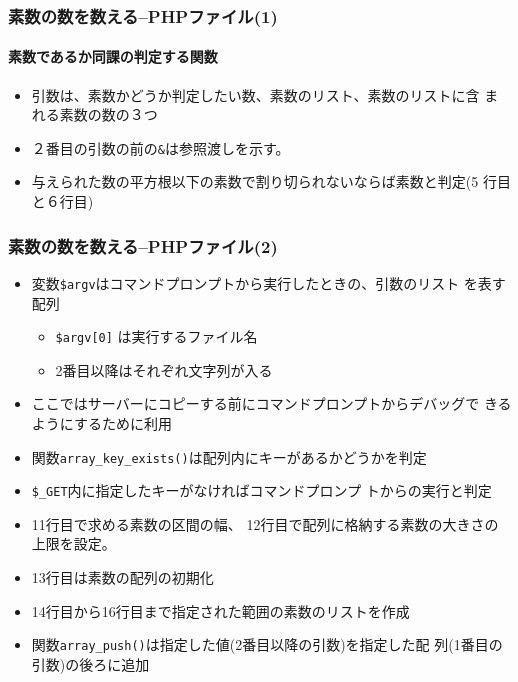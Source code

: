 \begin{frame}[containsverbatim]
 \frametitle{素数の数を数える--PHPファイル(1)}
 \framesubtitle{素数であるか同課の判定する関数}
 \begin{itemize}
  \item 引数は、素数かどうか判定したい数、素数のリスト、素数のリストに含
        まれる素数の数の３つ
  \item ２番目の引数の前の\texttt{\&}は参照渡しを示す。
  \item 与えられた数の平方根以下の素数で割り切られないならば素数と判定(5
        行目と６行目)
 \end{itemize}
\end{frame}
\begin{frame}[containsverbatim]
 \frametitle{素数の数を数える--PHPファイル(2)}
 \scriptsize
 \begin{itemize}
  \item 変数\Verb+$argv+はコマンドプロンプトから実行したときの、引数のリスト
        を表す配列
        \begin{itemize} \scriptsize

         \item \Verb+$argv[0]+ は実行するファイル名
         \item 2番目以降はそれぞれ文字列が入る
        \end{itemize}
  \item ここではサーバーにコピーする前にコマンドプロンプトからデバッグで
        きるようにするために利用
  \item 関数\Verb+array_key_exists()+は配列内にキーがあるかどうかを判定
  \item \Verb+$_GET+内に指定したキーがなければコマンドプロンプ
        トからの実行と判定
  \item 11行目で求める素数の区間の幅、
        12行目で配列に格納する素数の大きさの上限を設定。
  \item 13行目は素数の配列の初期化
  \item 14行目から16行目まで指定された範囲の素数のリストを作成
  \item 関数\Verb+array_push()+は指定した値(2番目以降の引数)を指定した配
        列(1番目の引数)の後ろに追加
 \end{itemize}
\end{frame}
